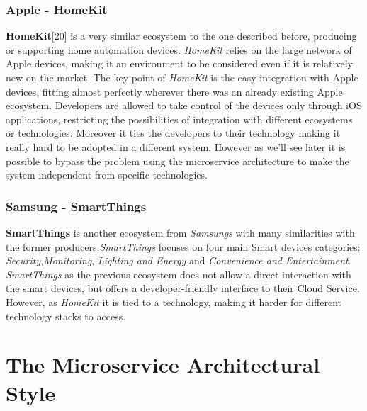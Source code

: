 \subsubsection{Apple - HomeKit}

\textbf{HomeKit}[20] is a very similar ecosystem to the one described before, producing or supporting
home automation devices. \textit{HomeKit} relies on the large network of Apple devices,
making it an environment to be considered even if it is relatively new on the market. The key
point of \textit{HomeKit} is the easy integration with Apple devices, fitting almost perfectly wherever
there was an already existing Apple ecosystem. Developers are allowed to take control of the devices
only through iOS applications, restricting the possibilities of integration with different ecosystems or
technologies. Moreover it ties the developers to their technology making it really hard to be adopted in a different
system. However as we'll see later it is possible to bypass the problem using the microservice architecture to
make the system independent from specific technologies.


\subsubsection{Samsung - SmartThings}

\textbf{SmartThings} is another ecosystem from \textit{Samsungs} with many similarities
with the former producers.\textit{SmartThings} focuses on four main Smart devices categories:
\textit{Security},\textit{Monitoring}, \textit{Lighting and Energy} and \textit{Convenience and Entertainment}.
\textit{SmartThings} as the previous ecosystem does not allow a direct interaction with the smart devices,
but offers a developer-friendly interface to their Cloud Service. However, as \textit{HomeKit} it is tied to
a technology, making it harder for different technology stacks to access.


\section{The Microservice Architectural Style}

